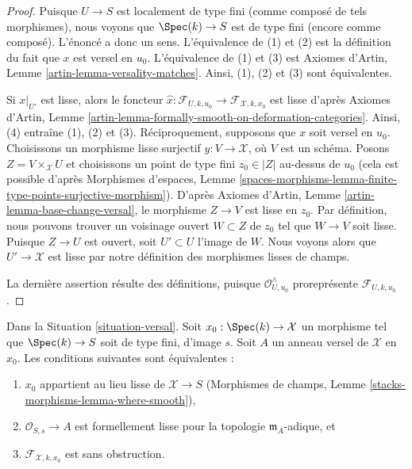 \begin{proof}
Puisque $U \to S$ est localement de type fini (comme composé de tels morphismes),
nous voyons que $\Spec(k) \to S$ est de type fini (encore comme composé).
L'énoncé a donc un sens. L'équivalence de (1) et (2)
est la définition du fait que $x$ est versel en $u_0$.
L'équivalence de (1) et (3) est
Axiomes d'Artin, Lemme \ref{artin-lemma-versality-matches}.
Ainsi, (1), (2) et (3) sont équivalentes.

\medskip\noindent
Si $x|_{U'}$ est lisse, alors le foncteur
$\hat x : \mathcal{F}_{U, k, u_0} \to \mathcal{F}_{\mathcal{X}, k, x_0}$
est lisse d'après Axiomes d'Artin, Lemme
\ref{artin-lemma-formally-smooth-on-deformation-categories}.
Ainsi, (4) entraîne (1), (2) et (3).
Réciproquement, supposons que $x$ soit versel en $u_0$.
Choisissons un morphisme lisse surjectif $y : V \to \mathcal{X}$, où $V$
est un schéma. Posons $Z = V \times_\mathcal{X} U$ et choisissons un
point de type fini $z_0 \in |Z|$ au-dessus de $u_0$ (cela est possible d'après
Morphismes d'espaces, Lemme
\ref{spaces-morphisms-lemma-finite-type-points-surjective-morphism}).
D'après Axiomes d'Artin, Lemme \ref{artin-lemma-base-change-versal},
le morphisme $Z \to V$ est lisse en $z_0$.
Par définition, nous pouvons trouver un voisinage ouvert $W \subset Z$
de $z_0$ tel que $W \to V$ soit lisse. Puisque $Z \to U$ est ouvert,
soit $U' \subset U$ l'image de $W$. Nous voyons alors que
$U' \to \mathcal{X}$ est lisse par notre définition des morphismes lisses
de champs.

\medskip\noindent
La dernière assertion résulte des définitions, puisque
$\mathcal{O}_{U, u_0}^\wedge$
proreprésente $\mathcal{F}_{U, k, u_0}$.
\end{proof}

\begin{lemma}
\label{lemma-characterize-smoothness}
Dans la Situation \ref{situation-versal}. Soit $x_0 : \Spec(k) \to \mathcal{X}$
un morphisme tel que $\Spec(k) \to S$ soit de type fini, d'image $s$.
Soit $A$ un anneau versel de $\mathcal{X}$ en $x_0$. Les conditions suivantes
sont équivalentes :
\begin{enumerate}
\item $x_0$ appartient au lieu lisse de $\mathcal{X} \to S$
(Morphismes de champs, Lemme \ref{stacks-morphisms-lemma-where-smooth}),
\item $\mathcal{O}_{S, s} \to A$ est formellement lisse pour la
topologie $\mathfrak m_A$-adique, et
\item $\mathcal{F}_{\mathcal{X}, k, x_0}$ est sans obstruction.
\end{enumerate}
\end{lemma}

